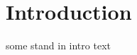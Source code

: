 \documentclass{article}
\begin{document}
\section*{Introduction}

some stand in intro text






\end{document}
